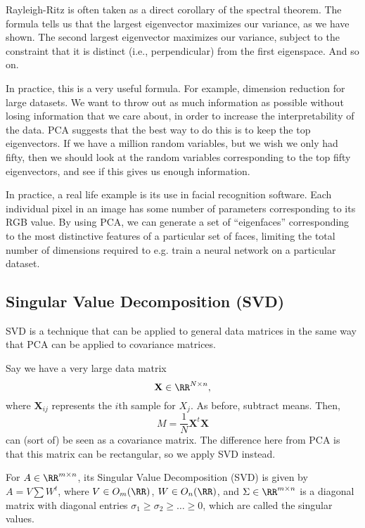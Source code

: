Rayleigh-Ritz is often taken as a direct corollary of the spectral theorem. The formula tells us that the largest eigenvector maximizes our variance, as we have shown. The second largest eigenvector maximizes our variance, subject to the constraint that it is distinct (i.e., perpendicular) from the first eigenspace. And so on. 

In practice, this is a very useful formula. For example, dimension reduction for large datasets. We want to throw out as much information as possible without losing information that we care about, in order to increase the interpretability of the data. PCA suggests that the best way to do this is to keep the top eigenvectors. If we have a million random variables, but we wish we only had fifty, then we should look at the random variables corresponding to the top fifty eigenvectors, and see if this gives us enough information. 

In practice, a real life example is its use in facial recognition software. Each individual pixel in an image has some number of parameters corresponding to its RGB value. By using PCA, we can generate a set of ``eigenfaces'' corresponding to the most distinctive features of a particular set of faces, limiting the total number of dimensions required to e.g. train a neural network on a particular dataset. 

\subsection{Singular Value Decomposition (SVD)}

SVD is a technique that can be applied to general data matrices in the same way that PCA can be applied to covariance matrices. 

Say we have a very large data matrix
\[\mathbf{X}\in \RR^{N\times n},\]
where $\mathbf{X}_{ij}$ represents the $i$th sample for $X_j$. As before, subtract means. Then,
\[M = \frac{1}{N}\mathbf{X}^t\mathbf{X}\]
can (sort of) be seen as a covariance matrix. The difference here from PCA is that this matrix can be rectangular, so we apply SVD instead.

\begin{definition}

For $A\in \RR^{m\times n}$, its \ac{Singular Value Decomposition (SVD)} is given by $A = V\sum W^t$, where $V\in O_m(\RR)$, $W\in O_n(\RR)$, and $\Sigma\in \RR^{m\times n}$ is a diagonal matrix with diagonal entries $\sigma_1\geq \sigma_2 \geq \hdots \geq 0$, which are called the \ac{singular values}. 
\end{definition}

